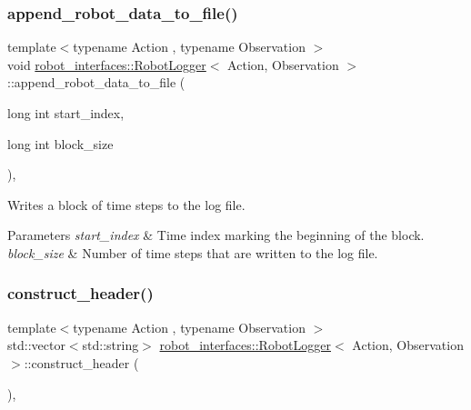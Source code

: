 \subsubsection{\texorpdfstring{append\+\_\+robot\+\_\+data\+\_\+to\+\_\+file()}{append\_robot\_data\_to\_file()}}
{\footnotesize\ttfamily template$<$typename Action , typename Observation $>$ \\
void \hyperlink{classrobot__interfaces_1_1RobotLogger}{robot\+\_\+interfaces\+::\+Robot\+Logger}$<$ Action, Observation $>$\+::append\+\_\+robot\+\_\+data\+\_\+to\+\_\+file (\begin{DoxyParamCaption}\item[{long int}]{start\+\_\+index,  }\item[{long int}]{block\+\_\+size }\end{DoxyParamCaption})\hspace{0.3cm}{\ttfamily [inline]}, {\ttfamily [private]}}



Writes a block of time steps to the log file. 


\begin{DoxyParams}{Parameters}
{\em start\+\_\+index} & Time index marking the beginning of the block. \\
\hline
{\em block\+\_\+size} & Number of time steps that are written to the log file. \\
\hline
\end{DoxyParams}
\mbox{\label{classrobot__interfaces_1_1RobotLogger_a9bcf9c2eaadd6e87b410daf65e0b3f07}} 
\subsubsection{\texorpdfstring{construct\+\_\+header()}{construct\_header()}}
{\footnotesize\ttfamily template$<$typename Action , typename Observation $>$ \\
std\+::vector$<$std\+::string$>$ \hyperlink{classrobot__interfaces_1_1RobotLogger}{robot\+\_\+interfaces\+::\+Robot\+Logger}$<$ Action, Observation $>$\+::construct\+\_\+header (\begin{DoxyParamCaption}{ }\end{DoxyParamCaption})\hspace{0.3cm}{\ttfamily [inline]}, {\ttfamily [private]}}




